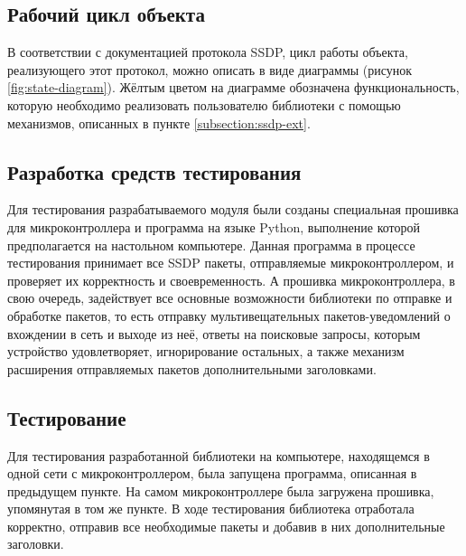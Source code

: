 
\subsection{Рабочий цикл объекта}

В соответствии с документацией протокола SSDP, цикл работы объекта, реализующего этот протокол, можно описать в виде диаграммы (рисунок \ref{fig:state-diagram}).
Жёлтым цветом на диаграмме обозначена функциональность, которую необходимо реализовать пользователю библиотеки с помощью механизмов, описанных в пункте \ref{subsection:ssdp-ext}.


\subsection{Разработка средств тестирования}

Для тестирования разрабатываемого модуля были созданы специальная прошивка для микроконтроллера и программа на языке Python, выполнение которой предполагается на настольном компьютере.
Данная программа в процессе тестирования принимает все SSDP пакеты, отправляемые микроконтроллером, и проверяет их корректность и своевременность.
А прошивка микроконтроллера, в свою очередь, задействует все основные возможности библиотеки по отправке и обработке пакетов, то есть отправку мультивещательных пакетов-уведомлений о вхождении в сеть и выходе из неё, ответы на поисковые запросы, которым устройство удовлетворяет, игнорирование остальных, а также механизм расширения отправляемых пакетов дополнительными заголовками.

\subsection{Тестирование}

Для тестирования разработанной библиотеки на компьютере, находящемся в одной сети с микроконтроллером, была запущена программа, описанная в предыдущем пункте.
На самом микроконтроллере была загружена прошивка, упомянутая в том же пункте.
В ходе тестирования библиотека отработала корректно, отправив все необходимые пакеты и добавив в них дополнительные заголовки.

